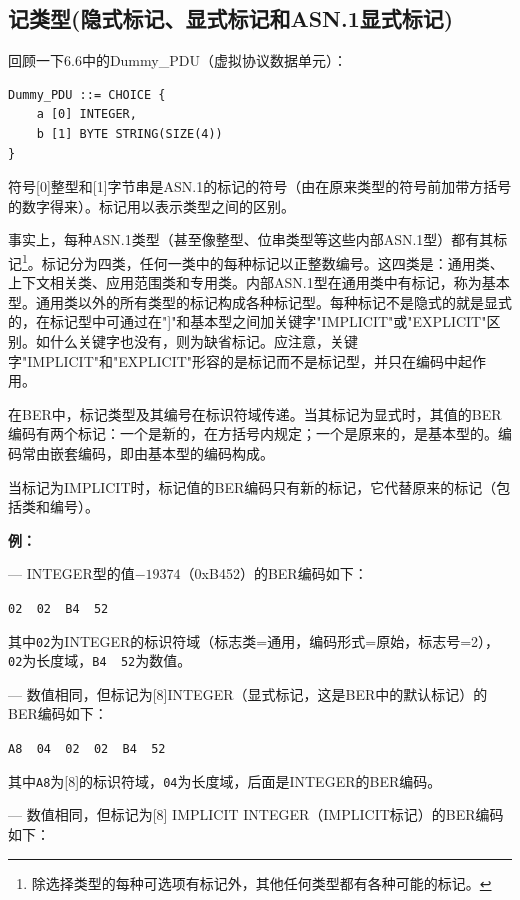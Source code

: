 \documentclass[a4paper,11pt]{ctexart}
\begin{document}
\subsection{记类型(隐式标记、显式标记和ASN.1显式标记)}

回顾一下6.6中的Dummy\_PDU（虚拟协议数据单元）：

\begin{verbatim}
Dummy_PDU ::= CHOICE {
    a [0] INTEGER,
    b [1] BYTE STRING(SIZE(4))
}
\end{verbatim}

符号[0]整型和[1]字节串是ASN.1的标记的符号（由在原来类型的符号前加带方括号的数字得来）。标记用以表示类型之间的区别。

事实上，每种ASN.1类型（甚至像整型、位串类型等这些内部ASN.1型）都有其标记\footnote{除选择类型的每种可选项有标记外，其他任何类型都有各种可能的标记。}。标记分为四类，任何一类中的每种标记以正整数编号。这四类是：通用类、上下文相关类、应用范围类和专用类。内部ASN.1型在通用类中有标记，称为基本型。通用类以外的所有类型的标记构成各种标记型。每种标记不是隐式的就是显式的，在标记型中可通过在"]"和基本型之间加关键字"IMPLICIT"或"EXPLICIT"区别。如什么关键字也没有，则为缺省标记。应注意，关键字"IMPLICIT"和"EXPLICIT"形容的是标记而不是标记型，并只在编码中起作用。

在BER中，标记类型及其编号在标识符域传递。当其标记为显式时，其值的BER编码有两个标记：一个是新的，在方括号内规定；一个是原来的，是基本型的。编码常由嵌套编码，即由基本型的编码构成。

当标记为IMPLICIT时，标记值的BER编码只有新的标记，它代替原来的标记（包括类和编号）。

\noindent\textbf{例：}

--- INTEGER型的值$-19374$（0xB452）的BER编码如下：

\begin{center}
\texttt{02~~02~~B4~~52}
\end{center}

\noindent 其中\texttt{02}为INTEGER的标识符域（标志类=通用，编码形式=原始，标志号=2），\texttt{02}为长度域，\texttt{B4~~52}为数值。

--- 数值相同，但标记为[8]INTEGER（显式标记，这是BER中的默认标记）的BER编码如下：

\begin{center}
\texttt{A8~~04~~02~~02~~B4~~52}
\end{center}

\noindent 其中\texttt{A8}为[8]的标识符域，\texttt{04}为长度域，后面是INTEGER的BER编码。

--- 数值相同，但标记为[8] IMPLICIT INTEGER（IMPLICIT标记）的BER编码如下：
\end{document}
